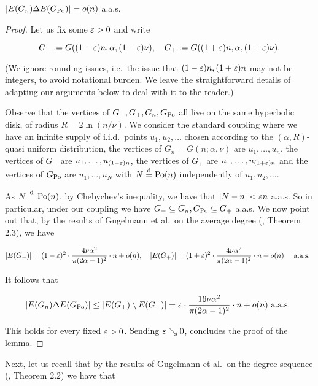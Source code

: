 \begin{lemma}\label{lem:NDGnGPo}
$|E(G_n) \Delta E(G_{{\mathrm{Po}}}) | = o(n)$ a.a.s. 
\end{lemma}

\begin{proof}
Let us fix some $\varepsilon>0$ and write 

$$G_- := G((1-\varepsilon)n, \alpha, (1-\varepsilon)\nu ), \quad G_+ := G((1+\varepsilon)n, \alpha, (1+\varepsilon)\nu ). $$

\noindent
(We ignore rounding issues, i.e.~the issue that $(1-\varepsilon)n, (1+\varepsilon)n$ may not be integers, 
to avoid notational burden. We leave the straightforward details of adapting our arguments below to deal with it to the reader.)

Observe that the vertices of $G_-, G_+, G_n, G_{{\mathrm{Po}}}$ all live on the same hyperbolic disk, of radius 
$R = 2\ln(n/\nu)$. 
We consider the standard coupling where we have an infinite supply of i.i.d.~points $u_1, u_2, \dots$ chosen according
to the $(\alpha,R)$-quasi uniform distribution, the vertices of $G_n = G(n;\alpha,\nu)$ are $u_1,\dots, u_n$, 
the vertices of $G_-$ are $u_1,\dots, u_{(1-\varepsilon)n}$, the vertices of $G_+$ are $u_1,\dots, u_{(1+\varepsilon)n}$ and 
the vertices of $G_{{\mathrm{Po}}}$ are $u_1,\dots, u_N$ with $N\stackrel{\text{d}}{=} {\mathrm{Po}}(n)$ independently of
$u_1, u_2, \dots$.

As $N\stackrel{\text{d}}{=}{\mathrm{Po}}(n)$, by Chebychev's inequality, we have that $|N-n| < \varepsilon n$ a.a.s.
So in particular, under our coupling we have $G_- \subseteq G_n, G_{{\mathrm{Po}}} \subseteq G_+$ a.a.s. 
We now point out that, by the results of Gugelmann et al.~on the average degree (\cite{gugelmann2012random}, Theorem 2.3), 
we have 

$$|E(G_-)| = (1-\varepsilon)^2\cdot \frac{4\nu\alpha^2}{\pi(2\alpha-1)^2} \cdot n + o(n), \quad 
|E(G_+)| = (1+\varepsilon)^2 \cdot \frac{4\nu\alpha^2}{\pi(2\alpha-1)^2} \cdot n + o(n) \quad \text{ a.a.s. } $$

It follows that 

$$ | E(G_n) \Delta E(G_{{\mathrm{Po}}}) | \leq |E(G_+)\setminus E(G_-)|
= \varepsilon \cdot \frac{16\nu\alpha^2}{\pi(2\alpha-1)^2}\cdot n + o(n) \text{ a.a.s. }
$$

This holds for every fixed $\varepsilon>0$. Sending $\varepsilon\searrow 0$, concludes the proof of the lemma.
\end{proof}

Next, let us recall that by the results of Gugelmann et al.~on the degree sequence
(\cite{gugelmann2012random}, Theorem 2.2) we have that 

